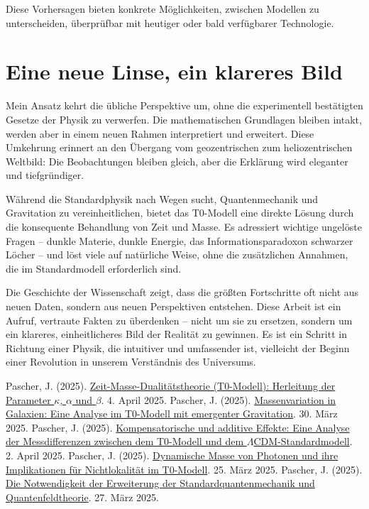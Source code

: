 \documentclass[a4paper,12pt]{article}
\begin{document}
	Diese Vorhersagen bieten konkrete Möglichkeiten, zwischen Modellen zu unterscheiden, überprüfbar mit heutiger oder bald verfügbarer Technologie.
	
	\section{Eine neue Linse, ein klareres Bild}
	
	Mein Ansatz kehrt die übliche Perspektive um, ohne die experimentell bestätigten Gesetze der Physik zu verwerfen. Die mathematischen Grundlagen bleiben intakt, werden aber in einem neuen Rahmen interpretiert und erweitert. Diese Umkehrung erinnert an den Übergang vom geozentrischen zum heliozentrischen Weltbild: Die Beobachtungen bleiben gleich, aber die Erklärung wird eleganter und tiefgründiger.
	
	Während die Standardphysik nach Wegen sucht, Quantenmechanik und Gravitation zu vereinheitlichen, bietet das T0-Modell eine direkte Lösung durch die konsequente Behandlung von Zeit und Masse. Es adressiert wichtige ungelöste Fragen – dunkle Materie, dunkle Energie, das Informationsparadoxon schwarzer Löcher – und löst viele auf natürliche Weise, ohne die zusätzlichen Annahmen, die im Standardmodell erforderlich sind.
	
	Die Geschichte der Wissenschaft zeigt, dass die größten Fortschritte oft nicht aus neuen Daten, sondern aus neuen Perspektiven entstehen. Diese Arbeit ist ein Aufruf, vertraute Fakten zu überdenken – nicht um sie zu ersetzen, sondern um ein klareres, einheitlicheres Bild der Realität zu gewinnen. Es ist ein Schritt in Richtung einer Physik, die intuitiver und umfassender ist, vielleicht der Beginn einer Revolution in unserem Verständnis des Universums.
	
	\begin{thebibliography}{99}
		 Pascher, J. (2025). \href{https://github.com/jpascher/T0-Time-Mass-Duality/tree/main/2/pdf/Deutsch/ZeitMasseT0Params.pdf}{Zeit-Masse-Dualitätstheorie (T0-Modell): Herleitung der Parameter \(\kappa\), \(\alpha\) und \(\beta\)}. 4. April 2025.
		 Pascher, J. (2025). \href{https://github.com/jpascher/T0-Time-Mass-Duality/tree/main/2/pdf/Deutsch/MassVarGalaxien.pdf}{Massenvariation in Galaxien: Eine Analyse im T0-Modell mit emergenter Gravitation}. 30. März 2025.
		 Pascher, J. (2025). \href{https://github.com/jpascher/T0-Time-Mass-Duality/tree/main/2/pdf/Deutsch/MessdifferenzenT0Standard.pdf}{Kompensatorische und additive Effekte: Eine Analyse der Messdifferenzen zwischen dem T0-Modell und dem \(\Lambda\)CDM-Standardmodell}. 2. April 2025.
		 Pascher, J. (2025). \href{https://github.com/jpascher/T0-Time-Mass-Duality/tree/main/2/pdf/Deutsch/DynMassePhotonenNichtlokal.pdf}{Dynamische Masse von Photonen und ihre Implikationen für Nichtlokalität im T0-Modell}. 25. März 2025.
		 Pascher, J. (2025). \href{https://github.com/jpascher/T0-Time-Mass-Duality/tree/main/2/pdf/Deutsch/NotwendigkeitQMErweiterung.pdf}{Die Notwendigkeit der Erweiterung der Standardquantenmechanik und Quantenfeldtheorie}. 27. März 2025.
	\end{thebibliography}
	
\end{document}

